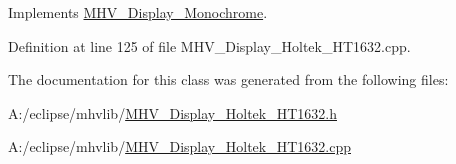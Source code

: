 \-Implements \hyperlink{class_m_h_v___display___monochrome_a58a17e8662802e7f5d6ccd6f0bcc51a0}{\-M\-H\-V\-\_\-\-Display\-\_\-\-Monochrome}.



\-Definition at line 125 of file \-M\-H\-V\-\_\-\-Display\-\_\-\-Holtek\-\_\-\-H\-T1632.\-cpp.



\-The documentation for this class was generated from the following files\-:\begin{DoxyCompactItemize}
\item 
\-A\-:/eclipse/mhvlib/\hyperlink{_m_h_v___display___holtek___h_t1632_8h}{\-M\-H\-V\-\_\-\-Display\-\_\-\-Holtek\-\_\-\-H\-T1632.\-h}\item 
\-A\-:/eclipse/mhvlib/\hyperlink{_m_h_v___display___holtek___h_t1632_8cpp}{\-M\-H\-V\-\_\-\-Display\-\_\-\-Holtek\-\_\-\-H\-T1632.\-cpp}\end{DoxyCompactItemize}
